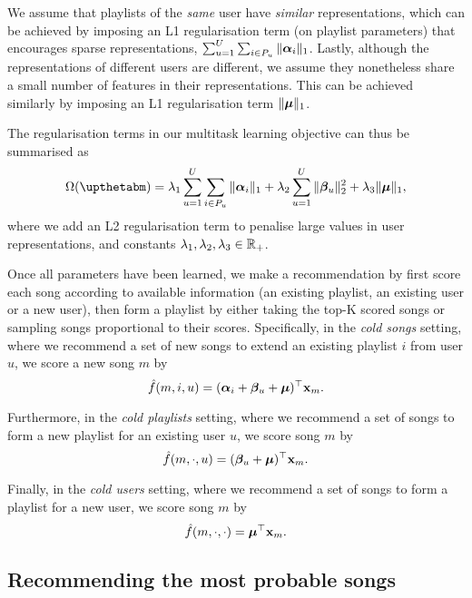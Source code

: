 We assume that playlists of the \emph{same} user have \emph{similar} representations,
which can be achieved by imposing an L1 regularisation term (on playlist parameters)
that encourages sparse representations, \ie $\sum_{u=1}^U \sum_{i \in P_u} \| {\bm{\alpha}}_i \|_1$.
Lastly, although the representations of different users are different,
we assume they nonetheless share a small number of features in their representations.
This can be achieved similarly by imposing an %
L1 regularisation term $\| \bm{\mu} \|_1$.

The regularisation terms in our multitask learning objective can thus be summarised as
\begin{equation}
\label{eq:reg}
\Omega(\upthetabm) = \lambda_1 \sum_{u=1}^U \sum_{i \in P_u} \|\alphabm_i\|_1 + \lambda_2 \sum_{u=1}^U \|\betabm_u\|_2^2 + \lambda_3 \| \bmu \|_1,
\end{equation}
where we add an L2 regularisation term to penalise large values in user representations,
and constants $\lambda_1, \lambda_2, \lambda_3 \in \mathbb{R}_+$.

Once all parameters have been learned, 
we make a recommendation by first score each song according to available information (\eg an existing playlist, an existing user or a new user),
then form a playlist by either taking the top-K scored songs or sampling songs proportional to their scores.
Specifically, in the {\it cold songs} setting, where we recommend a set of new songs to extend an existing playlist $i$ from user $u$, 
we score a new song $m$ by
$$
\hat f(m, i, u) = ({\bm{\alpha}}_i + {\bm{\beta}}_u + \bm{\mu})^\top \mathbf{x}_m.
$$

Furthermore, in the {\it cold playlists} setting, where we recommend a set of songs to form a new playlist for an existing user $u$, 
we score song $m$ by
$$
\hat f(m, \cdot, u) = ({\bm{\beta}}_u + \bm{\mu})^\top \mathbf{x}_m.
$$

Finally, in the {\it cold users} setting, where we recommend a set of songs to form a playlist for a new user,
we score song $m$ by
$$
\hat f(m, \cdot, \cdot) = \bm{\mu}^\top \mathbf{x}_m.
$$




\subsection{Recommending the most probable songs}
\label{ssec:bploss}

